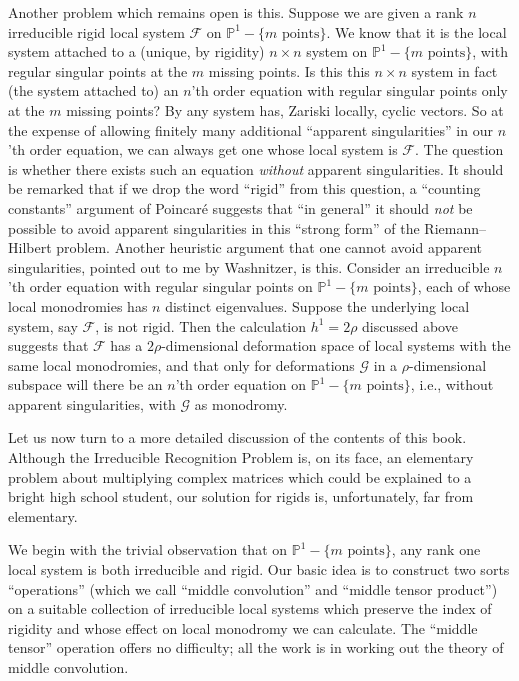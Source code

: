Another problem which remains open is this. Suppose we are given a rank
\(n\) irreducible rigid local system \(\mathcal{F}\) on
\(\mathbb{P}^1-\{m\text{ points}\}\). We know \cite{De-ED} that it is the
local system attached to a (unique, by rigidity) \(n\times n\) system on
\(\mathbb{P}^1-\{m\text{ points}\}\), with regular singular points at the
\(m\) missing points. Is this this \(n\times n\) system in fact (the system
attached to) an \(n\)'th order equation with regular singular points only
at the \(m\) missing points? By \cite{Ka-CV} any system has, Zariski
locally, cyclic vectors. So at the expense of allowing finitely many
additional ``apparent singularities'' in our \(n\)'th order equation, we
can always get one whose local system is \(\mathcal{F}\). The question is
whether there exists such an equation \emph{without} apparent
singularities. It should be remarked that if we drop the word ``rigid''
from this question, a ``counting constants'' argument of Poincar\'e
\cite[pp.\ 314--315 of Tome II, where he counts projective representations]{Poin}
suggests that ``in general'' it should \emph{not} be possible to avoid
apparent singularities in this ``strong form'' of the Riemann--Hilbert
problem. Another heuristic argument that one cannot avoid apparent
singularities, pointed out to me by Washnitzer, is this. Consider an
irreducible \(n\)'th order equation with regular singular points on
\(\mathbb{P}^1-\{m\text{ points}\}\), each of whose local monodromies has
\(n\) distinct eigenvalues. Suppose the underlying local system, say
\(\mathcal{F}\), is not rigid. Then the calculation \(h^1=2\rho\) discussed
above suggests that \(\mathcal{F}\) has a \(2\rho\)-dimensional deformation
space of local systems with the same local monodromies, and that only for
deformations \(\mathcal{G}\) in a \(\rho\)-dimensional subspace will there
be an \(n\)'th order equation on \(\mathbb{P}^1-\{m\text{ points}\}\),
i.e., without apparent singularities, with \(\mathcal{G}\) as monodromy.

Let us now turn to a more detailed discussion of the contents of this book.
Although the Irreducible Recognition Problem is, on its face, an elementary
problem about multiplying complex matrices which could be explained to a
bright high school student, our solution for rigids is, unfortunately,
far from elementary.

We begin with the trivial observation that on
\(\mathbb{P}^1-\{m\text{ points}\}\), any rank one local system is both
irreducible and rigid. Our basic idea is to construct two sorts
``operations'' (which we call ``middle convolution'' and ``middle tensor
product'') on a suitable collection of irreducible local systems which
preserve the index of rigidity and whose effect on local monodromy we can
calculate. The ``middle tensor'' operation offers no difficulty; all the
work is in working out the theory of middle convolution.

